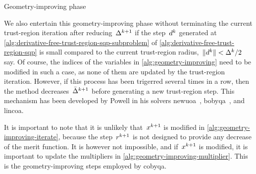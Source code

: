 \begin{algorithm}
    \caption{Geometry-improving phase}
    \label{alg:geometry-improving}
    \DontPrintSemicolon
    \onehalfspacing
\end{algorithm}

We also entertain this geometry-improving phase without terminating the current trust-region iteration after reducing~$\rad[k + 1]$ if the step~$\step[k]$ generated at \cref{alg:derivative-free-trust-region-sqp-subproblem} of \cref{alg:derivative-free-trust-region-sqp} is small compared to the current trust-region radius,~$\norm{\step[k]} < \rad[k] / 2$ say.
Of course, the indices of the variables in \cref{alg:geometry-improving} need to be modified in such a case, as none of them are updated by the trust-region iteration.
However, if this process has been trigerred several times in a row, then the method decreases~$\radlb[k + 1]$ before generating a new trust-region step.
This mechanism has been developed by Powell in his solvers \gls{newuoa}~\cite{Powell_2006}, \gls{bobyqa}~\cite{Powell_2009}, and \gls{lincoa}.

It is important to note that it is unlikely that~$\iter[k + 1]$ is modified in \cref{alg:geometry-improving-iterate}, because the step~$\rstep[k + 1]$ is not designed to provide any decrease of the merit function.
It is however not impossible, and if~$\iter[k + 1]$ is modified, it is important to update the multipliers in \cref{alg:geometry-improving-multiplier}.
This is the geometry-improving steps employed by \gls{cobyqa}.

